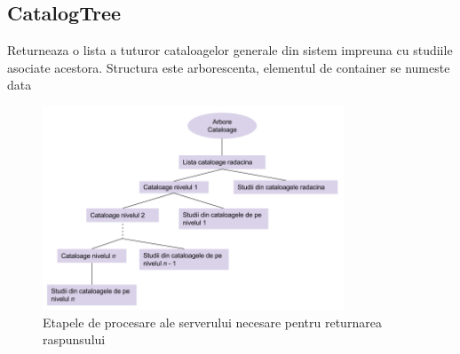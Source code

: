 \subsection{CatalogTree}

Returneaza o lista a tuturor cataloagelor generale din sistem impreuna
cu studiile asociate acestora. Structura este arborescenta, elementul
de container se numeste \textquotedbl{}data\textquotedbl{}

\begin{figure}[H]
\begin{centering}
\includegraphics[width=9cm]{img/catalogtree}
\par\end{centering}
\caption{Etapele de procesare ale serverului necesare pentru returnarea raspunsului}
\end{figure}

